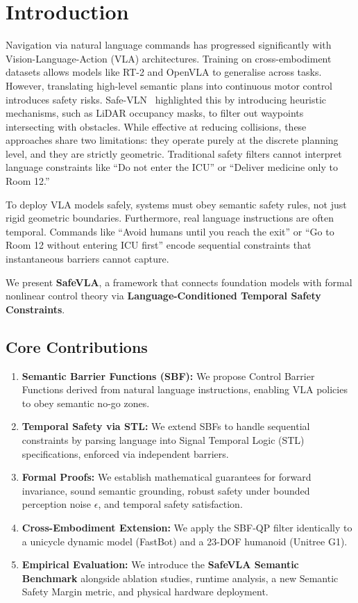 \documentclass[conference]{IEEEtran}
\begin{document}
\section{Introduction}
Navigation via natural language commands has progressed significantly with Vision-Language-Action (VLA) architectures. Training on cross-embodiment datasets allows models like RT-2 and OpenVLA to generalise across tasks. However, translating high-level semantic plans into continuous motor control introduces safety risks. Safe-VLN~\cite{safevln2024} highlighted this by introducing heuristic mechanisms, such as LiDAR occupancy masks, to filter out waypoints intersecting with obstacles. While effective at reducing collisions, these approaches share two limitations: they operate purely at the discrete planning level, and they are strictly geometric. Traditional safety filters cannot interpret language constraints like ``Do not enter the ICU'' or ``Deliver medicine only to Room 12.''

To deploy VLA models safely, systems must obey semantic safety rules, not just rigid geometric boundaries. Furthermore, real language instructions are often temporal. Commands like ``Avoid humans until you reach the exit'' or ``Go to Room 12 without entering ICU first'' encode sequential constraints that instantaneous barriers cannot capture.

We present \textbf{SafeVLA}, a framework that connects foundation models with formal nonlinear control theory via \textbf{Language-Conditioned Temporal Safety Constraints}.

\subsection{Core Contributions}
\begin{enumerate}
    \item \textbf{Semantic Barrier Functions (SBF):} We propose Control Barrier Functions derived from natural language instructions, enabling VLA policies to obey semantic no-go zones.
    \item \textbf{Temporal Safety via STL:} We extend SBFs to handle sequential constraints by parsing language into Signal Temporal Logic (STL) specifications, enforced via independent barriers.
    \item \textbf{Formal Proofs:} We establish mathematical guarantees for forward invariance, sound semantic grounding, robust safety under bounded perception noise $\epsilon$, and temporal safety satisfaction.
    \item \textbf{Cross-Embodiment Extension:} We apply the SBF-QP filter identically to a unicycle dynamic model (FastBot) and a 23-DOF humanoid (Unitree G1).
    \item \textbf{Empirical Evaluation:} We introduce the \textbf{SafeVLA Semantic Benchmark} alongside ablation studies, runtime analysis, a new Semantic Safety Margin metric, and physical hardware deployment.
\end{enumerate}
\end{document}
